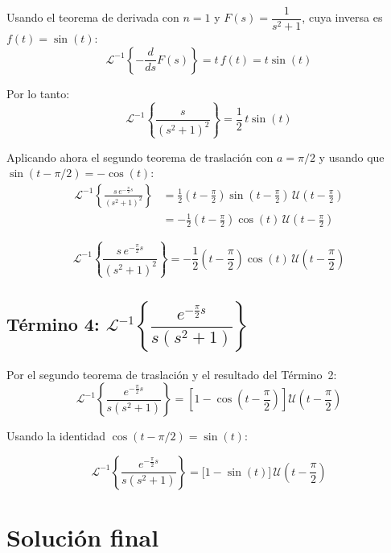 \documentclass[12pt, a4paper]{article}
\newcommand{\Lap}{\mathcal{L}}
\newcommand{\U}{\mathcal{U}}
\newenvironment{resultado}{%
    \begin{tcolorbox}[resultstyle]%
}{%
    \end{tcolorbox}%
}
\begin{document}
Usando el teorema de derivada con $n=1$ y $F(s) = \dfrac{1}{s^2+1}$, cuya inversa es $f(t) = \sin(t)$:
\[
    \Lap^{-1}\!\left\{-\frac{d}{ds}F(s)\right\} = t\,f(t) = t\sin(t)
\]

Por lo tanto:
\[
    \Lap^{-1}\!\left\{\frac{s}{(s^2+1)^2}\right\}
    = \frac{1}{2}\,t\sin(t)
\]

Aplicando ahora el segundo teorema de traslación con $a = \pi/2$ y usando que $\sin(t - \pi/2) = -\cos(t)$:
\begin{align*}
    \Lap^{-1}\!\left\{\frac{s\,e^{-\frac{\pi}{2}s}}{(s^2+1)^2}\right\}
    &= \frac{1}{2}\left(t-\frac{\pi}{2}\right)\sin\!\left(t-\frac{\pi}{2}\right)\,\U\!\left(t-\frac{\pi}{2}\right) \\[4pt]
    &= -\frac{1}{2}\left(t-\frac{\pi}{2}\right)\cos(t)\,\U\!\left(t-\frac{\pi}{2}\right)
\end{align*}

\begin{resultado}
\[
    \Lap^{-1}\!\left\{\frac{s\,e^{-\frac{\pi}{2}s}}{(s^2+1)^2}\right\}
    = -\frac{1}{2}\!\left(t-\frac{\pi}{2}\right)\cos(t)\,\U\!\left(t-\frac{\pi}{2}\right)
\]
\end{resultado}

\subsection{Término 4: \texorpdfstring{$\Lap^{-1}\!\left\{\dfrac{e^{-\frac{\pi}{2}s}}{s(s^2+1)}\right\}$}{}}

Por el segundo teorema de traslación y el resultado del Término~2:
\[
    \Lap^{-1}\!\left\{\frac{e^{-\frac{\pi}{2}s}}{s(s^2+1)}\right\}
    = \left[1 - \cos\!\left(t-\frac{\pi}{2}\right)\right]\U\!\left(t-\frac{\pi}{2}\right)
\]

Usando la identidad $\cos(t - \pi/2) = \sin(t)$:

\begin{resultado}
\[
    \Lap^{-1}\!\left\{\frac{e^{-\frac{\pi}{2}s}}{s(s^2+1)}\right\}
    = \bigl[1 - \sin(t)\bigr]\,\U\!\left(t-\frac{\pi}{2}\right)
\]
\end{resultado}

\section{Solución final}
\end{document}
